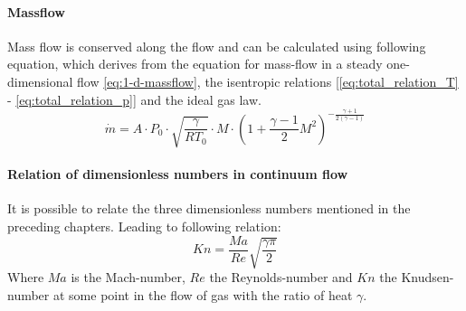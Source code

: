 	\paragraph{Massflow}
		Mass flow is conserved along the flow and can be calculated using following equation, which derives from the equation for mass-flow in a steady one-dimensional flow \eqref{eq:1-d-massflow}, the isentropic relations [\eqref{eq:total_relation_T} - \eqref{eq:total_relation_p}] and the ideal gas law.
		\cite{benson_mass_nodate}
		\begin{equation}
			\dot{m} = A \cdot P_0 \cdot \sqrt{\frac{\gamma}{R T_0}} \cdot M \cdot \left(1 + \frac{\gamma - 1}{2} M^2\right)^{-\frac{\gamma + 1}{2(\gamma - 1)}}
			\label{eq:1-d-massflow}
		\end{equation}
	\paragraph{Relation of dimensionless numbers in continuum flow}
		It is possible to relate the three dimensionless numbers mentioned in the preceding chapters.
		Leading to following relation:
		\begin{equation}
			Kn = \frac{Ma}{Re}\sqrt{\frac{\gamma \pi}{2}}
			\label{eq:nondim-relation}
		\end{equation}
		Where $Ma$ is the Mach-number, $Re$ the Reynolds-number and $Kn$ the Knudsen-number at some point in the flow of gas with the ratio of heat $\gamma$.
		\cite{Cengel2017, LiLam1964, EMMONS1958}
